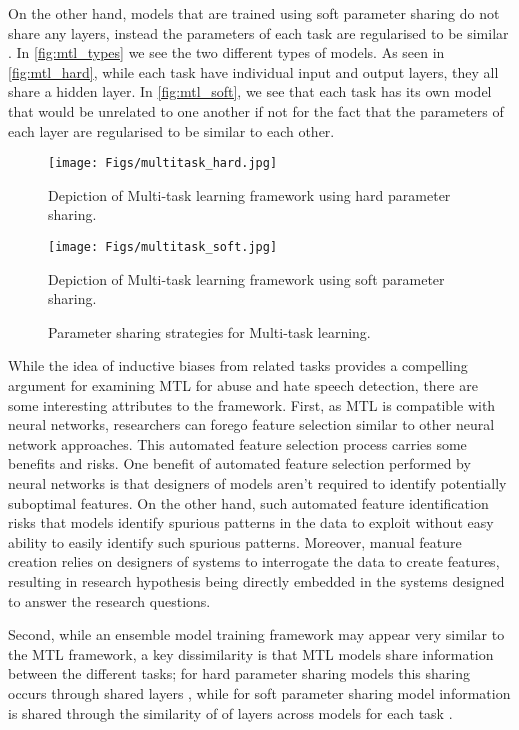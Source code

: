 On the other hand, models that are trained using soft parameter sharing do not share any layers, instead the parameters of each task are regularised to be similar \citep{Duong:2015}.
In \autoref{fig:mtl_types} we see the two different types of models.
As seen in \autoref{fig:mtl_hard}, while each task have individual input and output layers, they all share a hidden layer.
In \autoref{fig:mtl_soft}, we see that each task has its own model that would be unrelated to one another if not for the fact that the parameters of each layer are regularised to be similar to each other.

\begin{figure}
 \centering
 \begin{minipage}{0.5\linewidth}
   \centering
   \texttt{[image: Figs/multitask\_hard.jpg]}
   \caption{Depiction of Multi-task learning framework using hard parameter sharing.}
   \label{fig:mtl_hard}
 \end{minipage}
 \begin{minipage}{0.5\linewidth}
   \centering
    \texttt{[image: Figs/multitask\_soft.jpg]}
   \caption{Depiction of Multi-task learning framework using soft parameter sharing.}
   \label{fig:mtl_soft}
 \end{minipage}
 \caption{Parameter sharing strategies for Multi-task learning.}
 \label{fig:mtl_types}
\end{figure}

While the idea of inductive biases from related tasks provides a compelling argument for examining MTL for abuse and hate speech detection, there are some interesting attributes to the framework.
First, as MTL is compatible with neural networks, researchers can forego feature selection similar to other neural network approaches. This automated feature selection process carries some benefits and risks.
One benefit of automated feature selection performed by neural networks is that designers of models aren't required to identify potentially suboptimal features. 
On the other hand, such automated feature identification risks that models identify spurious patterns in the data to exploit without easy ability to easily identify such spurious patterns.
Moreover, manual feature creation relies on designers of systems to interrogate the data to create features, resulting in research hypothesis being directly embedded in the systems designed to answer the research questions.

Second, while an ensemble model training framework may appear very similar to the MTL framework, a key dissimilarity is that MTL models share information between the different tasks; for hard parameter sharing models this sharing occurs through shared layers \citep{Caruana:1993}, while for soft parameter sharing model information is shared through the similarity of of layers across models for each task \citep{Duong:2015}.

